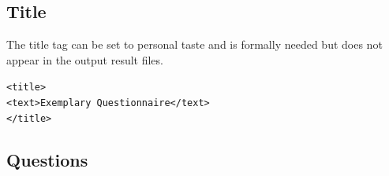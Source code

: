 \documentclass[11pt,a4paper,titlepage]{article}
\begin{document}
\subsection{Title}

The title tag can be set to personal taste and is formally needed but does not appear in the output result files.
%
\begin{center}
\begin{tcolorbox}[colback=black!10!white,colframe=black!50!white]
\texttt{<title>\\
\hspace*{0.5cm}<text>Exemplary Questionnaire</text>\\
</title>}
\end{tcolorbox}
\end{center}

\subsection{Questions}
\end{document}
